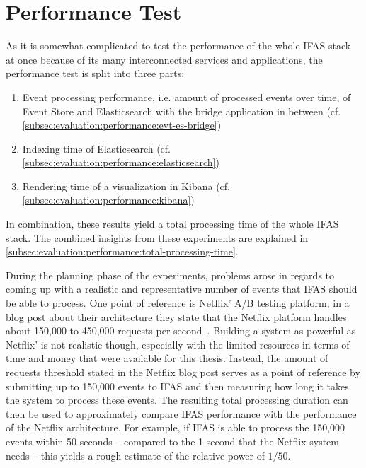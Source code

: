\section{Performance Test}
\label{sec:evaluation:performance}

As it is somewhat complicated to test the performance of the whole \ac{IFAS} stack at once because of its many interconnected services and applications, the performance test is split into three parts:

\begin{enumerate}[noitemsep]
\item Event processing performance, i.e. amount of processed events over time, of Event Store and Elasticsearch with the bridge application in between (cf. \cref{subsec:evaluation:performance:evt-es-bridge})
\item Indexing time of Elasticsearch (cf. \cref{subsec:evaluation:performance:elasticsearch})
\item Rendering time of a visualization in Kibana (cf. \cref{subsec:evaluation:performance:kibana})
\end{enumerate}

In combination, these results yield a total processing time of the whole \ac{IFAS} stack.
The combined insights from these experiments are explained in \cref{subsec:evaluation:performance:total-processing-time}.

During the planning phase of the experiments, problems arose in regards to coming up with a realistic and representative number of events that \ac{IFAS} should be able to process.
One point of reference is Netflix' A/B testing platform; in a blog post about their architecture they state that the Netflix platform handles about 150,000 to 450,000 requests per second~\cite{WEB:Netflix:2016}.
Building a system as powerful as Netflix' is not realistic though, especially with the limited resources in terms of time and money that were available for this thesis.
Instead, the amount of requests threshold stated in the Netflix blog post serves as a point of reference by submitting up to 150,000 events to \ac{IFAS} and then measuring how long it takes the system to process these events.
The resulting total processing duration can then be used to approximately compare \ac{IFAS} performance with the performance of the Netflix architecture.
For example, if \ac{IFAS} is able to process the 150,000 events within 50 seconds -- compared to the 1 second that the Netflix system needs -- this yields a rough estimate of the relative power of $1/50$.

